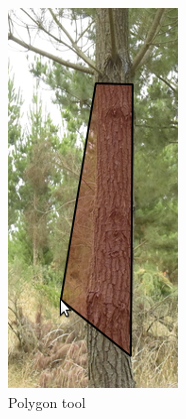 \documentclass{article}
\begin{document}
\begin{figure}[h!]
\begin{subfigure}[t]{.3\textwidth}
  \includegraphics[width=0.6\linewidth]{images/polygon_tool.png}
  \caption{Polygon tool}
\end{subfigure}%
\begin{subfigure}[t]{.3\textwidth}
  \centering

\end{subfigure}
\end{figure}
\end{document}
